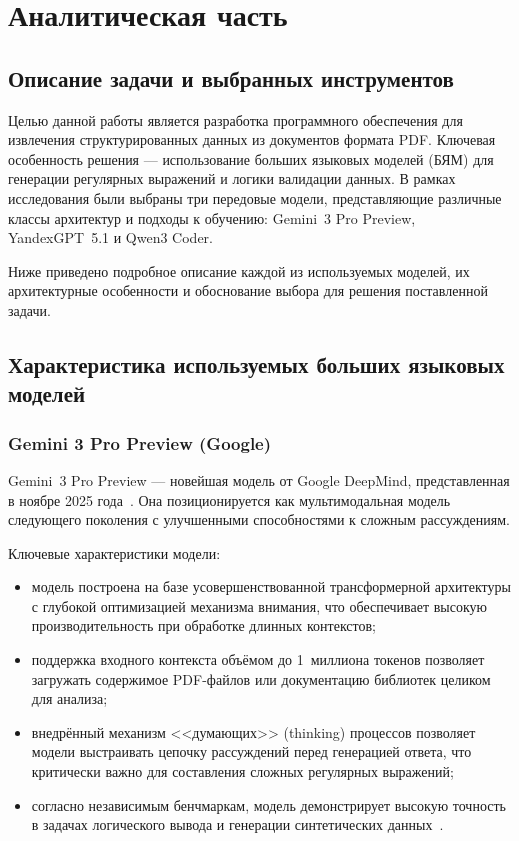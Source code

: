 \chapter{Аналитическая часть}

\section{Описание задачи и выбранных инструментов}
Целью данной работы является разработка программного обеспечения для извлечения структурированных данных из документов формата PDF. Ключевая особенность решения --- использование больших языковых моделей (БЯМ) для генерации регулярных выражений и логики валидации данных. В рамках исследования были выбраны три передовые модели, представляющие различные классы архитектур и подходы к обучению: Gemini~3 Pro Preview, YandexGPT~5.1 и Qwen3 Coder.

Ниже приведено подробное описание каждой из используемых моделей, их архитектурные особенности и обоснование выбора для решения поставленной задачи.

\section{Характеристика используемых больших языковых моделей}

\subsection{Gemini 3 Pro Preview (Google)}
Gemini~3 Pro Preview --- новейшая модель от Google DeepMind, представленная в ноябре 2025 года~\cite{gemini3_release}. Она позиционируется как мультимодальная модель следующего поколения с улучшенными способностями к сложным рассуждениям.

Ключевые характеристики модели:
\begin{itemize}
    \item модель построена на базе усовершенствованной трансформерной архитектуры с глубокой оптимизацией механизма внимания, что обеспечивает высокую производительность при обработке длинных контекстов;
    \item поддержка входного контекста объёмом до 1~миллиона токенов позволяет загружать содержимое PDF-файлов или документацию библиотек целиком для анализа;
    \item внедрённый механизм <<думающих>> (thinking) процессов позволяет модели выстраивать цепочку рассуждений перед генерацией ответа, что критически важно для составления сложных регулярных выражений;
    \item согласно независимым бенчмаркам, модель демонстрирует высокую точность в задачах логического вывода и генерации синтетических данных~\cite{gemini_bench}.
\end{itemize}

